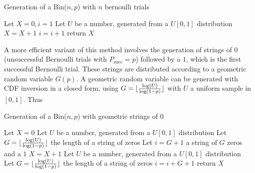 \documentclass[10pt]{article}
\DeclarePairedDelimiter{\floor}{\lfloor}{\rfloor}
\begin{document}
\begin{algorithm}
  \caption{Generation of a Bin($n, p$) with $n$ bernoulli trials}\label{ber}
  \begin{algorithmic}[1]
    \Procedure{}{}
    \State Let $X = 0, i = 1$
    \State Let $U$ be a number, generated from a $U[0,1]$ distribution
    \State $X = X + 1$
    \EndIf
    \State $i = i + 1$
    \EndWhile
    \State return $X$
    \EndProcedure
  \end{algorithmic}
\end{algorithm}

A more efficient variant of this method involves the generation of strings of $0$ (unsuccessful Bernoulli trials with $P_{\text{succ}} = p$) followed by a $1$, which is the first successful Bernoulli trial. These strings are distributed according to a geometric random variable $G(p)$. A geometric random variable can be generated with CDF inversion in a closed form, using $G = \floor{\frac{\log(U)}{\log(1-p)}}$ with $U$ a uniform sample in $[0,1]$. Thus
\begin{algorithm}
  \caption{Generation of a Bin($n, p$) with geometric strings of $0$}\label{geo}
  \begin{algorithmic}[1]
    \Procedure{}{}
    \State Let $X = 0$
    \State Let $U$ be a number, generated from a $U[0,1]$ distribution
    \State Let $G = \floor{\frac{\log(U)}{\log(1-p)}}$ the length of a string of zeros
    \State Let $i = G + 1$ a string of $G$ zeros and a $1$
    \State $X = X + 1$
    \State Let $U$ be a number, generated from a $U[0,1]$ distribution
    \State Let $G = \floor{\frac{\log(U)}{\log(1-p)}}$ the length of a string of zeros
    \State $i = i +G+ 1$
    \EndWhile
    \State return $X$
    \EndProcedure
  \end{algorithmic}
\end{algorithm}
\end{document}
